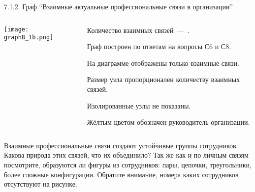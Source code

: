 \begin{frame}{7.1.2. Граф ``Взаимные актуальные профессиональные связи в организации''}

\begin{columns}
\begin{column}{0.7\textwidth} 
\centering
          \texttt{[image: graph8\_1b.png]}
\end{column}
\begin{column}{0.3\textwidth} 

\tiny
Количество взаимных связей~---~\valHABlinks.
\smallskip

Граф построен по ответам на вопросы С6 и С8.
\smallskip

\socioSizeComment
\smallskip

На диаграмме отображены только взаимные связи.
\smallskip

Размер узла пропорционален количеству взаимных связей.
\smallskip

Изолированные узлы не показаны.
\smallskip

Жёлтым цветом обозначен руководитель организации.

\end{column}
\end{columns}

\fontsize{6pt}{7}\selectfont
Взаимные профессиональные связи создают устойчивые группы сотрудников. 
Какова природа этих связей, что их объединило?
Так же как  и по личным связям посмотрите, образуются ли фигуры из сотрудников: 
пары, цепочки, треугольники, более сложные конфигурации. 
Обратите внимание, номера каких сотрудников отсутствуют на рисунке. 


\end{frame}


